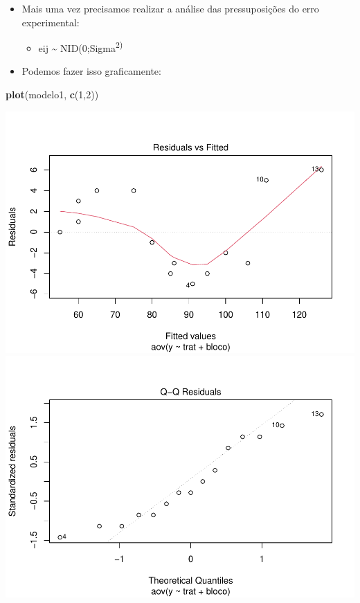 \documentclass[
]{book}
\newenvironment{Shaded}{\begin{snugshade}}{\end{snugshade}}
\newcommand{\DecValTok}[1]{\textcolor[rgb]{0.00,0.00,0.81}{#1}}
\newcommand{\FunctionTok}[1]{\textcolor[rgb]{0.13,0.29,0.53}{\textbf{#1}}}
\newcommand{\NormalTok}[1]{#1}
\providecommand{\tightlist}{%
  \setlength{\itemsep}{0pt}\setlength{\parskip}{0pt}}
\begin{document}
\begin{itemize}
\tightlist
\item
  Mais uma vez precisamos realizar a análise das pressuposições do erro experimental:

  \begin{itemize}
  \tightlist
  \item
    eij \textasciitilde{} NID(0;Sigma\textsuperscript{2)}
  \end{itemize}
\item
  Podemos fazer isso graficamente:
\end{itemize}

\begin{Shaded}
\begin{Highlighting}[]
\FunctionTok{plot}\NormalTok{(modelo1, }\FunctionTok{c}\NormalTok{(}\DecValTok{1}\NormalTok{,}\DecValTok{2}\NormalTok{))}
\end{Highlighting}
\end{Shaded}

\includegraphics{_main_files/figure-latex/unnamed-chunk-7-1.pdf} \includegraphics{_main_files/figure-latex/unnamed-chunk-7-2.pdf}
\end{document}
